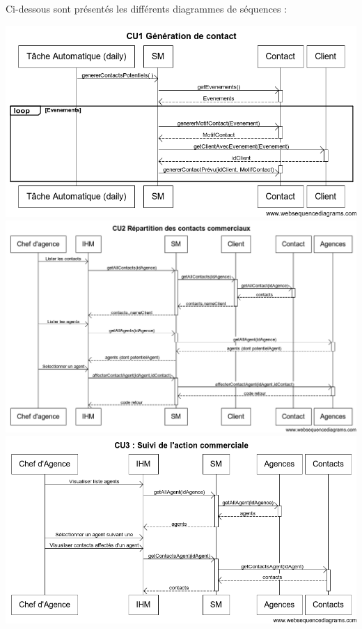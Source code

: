 Ci-dessous sont présentés les différents diagrammes de séquences :
\begin {center}
\includegraphics[width=\textwidth]{../../webSequenceDiagrameSources/cu1.png}
\includegraphics[width=\textwidth]{../../webSequenceDiagrameSources/cu2.png}
\includegraphics[width=\textwidth]{../../webSequenceDiagrameSources/cu3.png}

\end{center}
